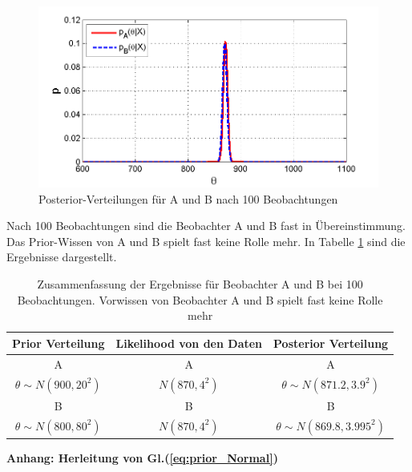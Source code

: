 \begin{figure}[!h]
	\begin{center}
		\includegraphics[width=130mm]{08_vorlesung/media/posterior_A_posterior_B_100_Beobachtungen}
		\caption{Posterior-Verteilungen für A und B nach 100 Beobachtungen}
		\label{fig:9_Beispiel_1_e} 
	\end{center}
\end{figure}

Nach 100 Beobachtungen sind die Beobachter A und B fast in Übereinstimmung.
Das Prior-Wissen von A und B spielt fast keine Rolle mehr. In Tabelle 
\ref{tab:Ergebnisse des Beispiels_bei_100_Stichproben} sind die Ergebnisse
dargestellt.

\begin{table}[!h]
	\caption{Zusammenfassung der Ergebnisse für Beobachter A und B bei 100
	Beobachtungen. Vorwissen von Beobachter A und B spielt fast keine Rolle mehr}
	\centering
	\begin{tabular}{c c c}  \hline 
		Prior Verteilung & Likelihood von den Daten & Posterior Verteilung\\
		\hline
		A & A & A \\
		$\theta \sim N(900, 20^2)$ &$N(870,4^2)$ & $\theta \sim N(871.2, 3.9^2)$ \\ 
		B &B & B \\
		$\theta \sim N(800, 80^2)$ &$N(870,4^2)$ & $\theta \sim N(869.8, 3.995^2)$ \\
		\hline 
	\end{tabular}
	\label{tab:Ergebnisse des Beispiels_bei_100_Stichproben}
\end{table}
\newpage
\textbf{Anhang: Herleitung von Gl.(\ref{eq:prior_Normal})}

